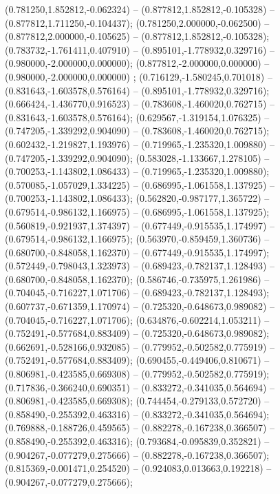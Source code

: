  (0.781250,1.852812,-0.062324) -- (0.877812,1.852812,-0.105328) -- (0.877812,1.711250,-0.104437);
 (0.781250,2.000000,-0.062500) -- (0.877812,2.000000,-0.105625) -- (0.877812,1.852812,-0.105328);
 (0.783732,-1.761411,0.407910) -- (0.895101,-1.778932,0.329716) -- (0.980000,-2.000000,0.000000);
 (0.877812,-2.000000,0.000000) -- (0.980000,-2.000000,0.000000) ;
 (0.716129,-1.580245,0.701018) -- (0.831643,-1.603578,0.576164) -- (0.895101,-1.778932,0.329716);
 (0.666424,-1.436770,0.916523) -- (0.783608,-1.460020,0.762715) -- (0.831643,-1.603578,0.576164);
 (0.629567,-1.319154,1.076325) -- (0.747205,-1.339292,0.904090) -- (0.783608,-1.460020,0.762715);
 (0.602432,-1.219827,1.193976) -- (0.719965,-1.235320,1.009880) -- (0.747205,-1.339292,0.904090);
 (0.583028,-1.133667,1.278105) -- (0.700253,-1.143802,1.086433) -- (0.719965,-1.235320,1.009880);
 (0.570085,-1.057029,1.334225) -- (0.686995,-1.061558,1.137925) -- (0.700253,-1.143802,1.086433);
 (0.562820,-0.987177,1.365722) -- (0.679514,-0.986132,1.166975) -- (0.686995,-1.061558,1.137925);
 (0.560819,-0.921937,1.374397) -- (0.677449,-0.915535,1.174997) -- (0.679514,-0.986132,1.166975);
 (0.563970,-0.859459,1.360736) -- (0.680700,-0.848058,1.162370) -- (0.677449,-0.915535,1.174997);
 (0.572449,-0.798043,1.323973) -- (0.689423,-0.782137,1.128493) -- (0.680700,-0.848058,1.162370);
 (0.586746,-0.735975,1.261986) -- (0.704045,-0.716227,1.071706) -- (0.689423,-0.782137,1.128493);
 (0.607737,-0.671359,1.170974) -- (0.725320,-0.648673,0.989082) -- (0.704045,-0.716227,1.071706);
 (0.634876,-0.602214,1.053211) -- (0.752491,-0.577684,0.883409) -- (0.725320,-0.648673,0.989082);
 (0.662691,-0.528166,0.932085) -- (0.779952,-0.502582,0.775919) -- (0.752491,-0.577684,0.883409);
 (0.690455,-0.449406,0.810671) -- (0.806981,-0.423585,0.669308) -- (0.779952,-0.502582,0.775919);
 (0.717836,-0.366240,0.690351) -- (0.833272,-0.341035,0.564694) -- (0.806981,-0.423585,0.669308);
 (0.744454,-0.279133,0.572720) -- (0.858490,-0.255392,0.463316) -- (0.833272,-0.341035,0.564694);
 (0.769888,-0.188726,0.459565) -- (0.882278,-0.167238,0.366507) -- (0.858490,-0.255392,0.463316);
 (0.793684,-0.095839,0.352821) -- (0.904267,-0.077279,0.275666) -- (0.882278,-0.167238,0.366507);
 (0.815369,-0.001471,0.254520) -- (0.924083,0.013663,0.192218) -- (0.904267,-0.077279,0.275666);
